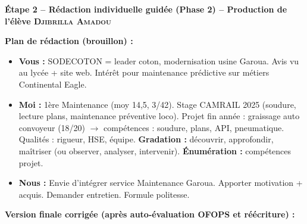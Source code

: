 \documentclass[11pt]{article}
\begin{document}
\begin{exoresolu}
\par
\textbf{Étape 2 -- Rédaction individuelle guidée (Phase 2) -- Production de l'élève \textsc{Djibrilla Amadou}}

\par
\textbf{Plan de rédaction (brouillon) :}
\begin{itemize}
    \item \textbf{Vous :} SODECOTON = leader coton, modernisation usine Garoua. Avis vu au lycée + site web. Intérêt pour maintenance prédictive sur métiers Continental Eagle.
    \item \textbf{Moi :} 1ère Maintenance (moy 14,5, 3/42). Stage CAMRAIL 2025 (soudure, lecture plans, maintenance préventive loco). Projet fin année : graissage auto convoyeur (18/20) $\rightarrow$ compétences : soudure, plans, API, pneumatique. Qualités : rigueur, HSE, équipe. \textbf{Gradation :} \og{}découvrir, approfondir, maîtriser\fg{} (ou \og{}observer, analyser, intervenir\fg{}). \textbf{Énumération :} compétences projet.
    \item \textbf{Nous :} Envie d'intégrer service Maintenance Garoua. Apporter motivation + acquis. Demander entretien. Formule politesse.
\end{itemize}

\par
\textbf{Version finale corrigée (après auto-évaluation OFOPS et réécriture) :}


\end{exoresolu}
\end{document}
